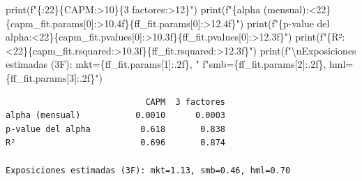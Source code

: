 \documentclass[
  spanish,
  letterpaper,
  DIV=11,
  numbers=noendperiod]{scrreprt}
\newenvironment{Shaded}{\begin{snugshade}}{\end{snugshade}}
\newcommand{\BuiltInTok}[1]{\textcolor[rgb]{0.00,0.23,0.31}{#1}}
\newcommand{\CharTok}[1]{\textcolor[rgb]{0.13,0.47,0.30}{#1}}
\newcommand{\DecValTok}[1]{\textcolor[rgb]{0.68,0.00,0.00}{#1}}
\newcommand{\NormalTok}[1]{\textcolor[rgb]{0.00,0.23,0.31}{#1}}
\newcommand{\SpecialCharTok}[1]{\textcolor[rgb]{0.37,0.37,0.37}{#1}}
\newcommand{\SpecialStringTok}[1]{\textcolor[rgb]{0.13,0.47,0.30}{#1}}
\newcommand{\StringTok}[1]{\textcolor[rgb]{0.13,0.47,0.30}{#1}}
\begin{document}
\begin{Shaded}
\begin{Highlighting}[]
\BuiltInTok{print}\NormalTok{(}\SpecialStringTok{f"}\SpecialCharTok{\{}\StringTok{\textquotesingle{}\textquotesingle{}}\SpecialCharTok{:22\}\{}\StringTok{\textquotesingle{}CAPM\textquotesingle{}}\SpecialCharTok{:\textgreater{}10\}\{}\StringTok{\textquotesingle{}3 factores\textquotesingle{}}\SpecialCharTok{:\textgreater{}12\}}\SpecialStringTok{"}\NormalTok{)}
\BuiltInTok{print}\NormalTok{(}\SpecialStringTok{f"}\SpecialCharTok{\{}\StringTok{\textquotesingle{}alpha (mensual)\textquotesingle{}}\SpecialCharTok{:\textless{}22\}\{}\NormalTok{capm\_fit}\SpecialCharTok{.}\NormalTok{params[}\DecValTok{0}\NormalTok{]}\SpecialCharTok{:\textgreater{}10.4f\}\{}\NormalTok{ff\_fit}\SpecialCharTok{.}\NormalTok{params[}\DecValTok{0}\NormalTok{]}\SpecialCharTok{:\textgreater{}12.4f\}}\SpecialStringTok{"}\NormalTok{)}
\BuiltInTok{print}\NormalTok{(}\SpecialStringTok{f"}\SpecialCharTok{\{}\StringTok{\textquotesingle{}p{-}value del alpha\textquotesingle{}}\SpecialCharTok{:\textless{}22\}\{}\NormalTok{capm\_fit}\SpecialCharTok{.}\NormalTok{pvalues[}\DecValTok{0}\NormalTok{]}\SpecialCharTok{:\textgreater{}10.3f\}\{}\NormalTok{ff\_fit}\SpecialCharTok{.}\NormalTok{pvalues[}\DecValTok{0}\NormalTok{]}\SpecialCharTok{:\textgreater{}12.3f\}}\SpecialStringTok{"}\NormalTok{)}
\BuiltInTok{print}\NormalTok{(}\SpecialStringTok{f"}\SpecialCharTok{\{}\StringTok{\textquotesingle{}R²\textquotesingle{}}\SpecialCharTok{:\textless{}22\}\{}\NormalTok{capm\_fit}\SpecialCharTok{.}\NormalTok{rsquared}\SpecialCharTok{:\textgreater{}10.3f\}\{}\NormalTok{ff\_fit}\SpecialCharTok{.}\NormalTok{rsquared}\SpecialCharTok{:\textgreater{}12.3f\}}\SpecialStringTok{"}\NormalTok{)}
\BuiltInTok{print}\NormalTok{(}\SpecialStringTok{f"}\CharTok{\textbackslash{}n}\SpecialStringTok{Exposiciones estimadas (3F): mkt=}\SpecialCharTok{\{}\NormalTok{ff\_fit}\SpecialCharTok{.}\NormalTok{params[}\DecValTok{1}\NormalTok{]}\SpecialCharTok{:.2f\}}\SpecialStringTok{, "}
      \SpecialStringTok{f"smb=}\SpecialCharTok{\{}\NormalTok{ff\_fit}\SpecialCharTok{.}\NormalTok{params[}\DecValTok{2}\NormalTok{]}\SpecialCharTok{:.2f\}}\SpecialStringTok{, hml=}\SpecialCharTok{\{}\NormalTok{ff\_fit}\SpecialCharTok{.}\NormalTok{params[}\DecValTok{3}\NormalTok{]}\SpecialCharTok{:.2f\}}\SpecialStringTok{"}\NormalTok{)}
\end{Highlighting}
\end{Shaded}

\begin{verbatim}
                            CAPM  3 factores
alpha (mensual)           0.0010      0.0003
p-value del alpha          0.618       0.838
R²                         0.696       0.874

Exposiciones estimadas (3F): mkt=1.13, smb=0.46, hml=0.70
\end{verbatim}
\end{document}
